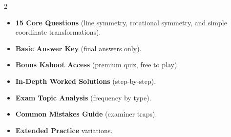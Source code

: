 \documentclass[11pt,a4paper]{article}
\newcommand{\FullReleaseDate}{April 30, 2026}
\begin{document}
\vspace{8pt}

\begin{multicols}{2}
  \begin{tcolorbox}[card, title=\sffamily\bfseries\textcolor{white}{\faHandPointDown\ TODAY (Simplified Version)}, colbacktitle=mainblue, boxed title style={sharp corners, boxrule=0pt}]
    \begin{itemize}[leftmargin=1.2em, itemsep=2pt]
      \item \small \textbf{15 Core Questions} (line symmetry, rotational symmetry, and simple coordinate transformations).
      \item \small \textbf{Basic Answer Key} (final answers only).
      \item \small \textbf{Bonus Kahoot Access} (premium quiz, free to play).
    \end{itemize}
  \end{tcolorbox}

  \columnbreak

  \begin{tcolorbox}[card, title=\sffamily\bfseries\textcolor{white}{\faRocket\ ON \FullReleaseDate\ (Full Upgrade)}, colbacktitle=mainblue, boxed title style={sharp corners, boxrule=0pt}]
    \begin{itemize}[leftmargin=1.2em, itemsep=2pt]
      \item \small \textbf{In-Depth Worked Solutions} (step-by-step).
      \item \small \textbf{Exam Topic Analysis} (frequency by type).
      \item \small \textbf{Common Mistakes Guide} (examiner traps).
      \item \small \textbf{Extended Practice} variations.
    \end{itemize}
  \end{tcolorbox}
\end{multicols}
\end{document}
